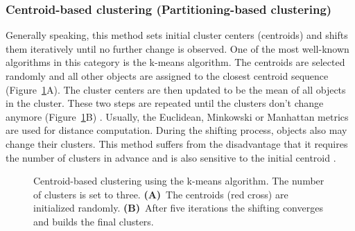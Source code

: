 \documentclass[12pt,a4paper,english]{article}
\begin{document}
\subsubsection*{Centroid-based clustering (Partitioning-based clustering)}
    Generally speaking, this method sets initial cluster centers (centroids) and shifts them iteratively until no further change is observed.
	One of the most well-known algorithms in this category is the k-means algorithm.
	The centroids are selected randomly and all other objects are assigned to the closest centroid sequence (Figure~\ref{img:centroid}A). The cluster centers are then updated to be the mean of all objects in the cluster. These two steps are repeated until the clusters don't change anymore (Figure~\ref{img:centroid}B) \citep{k-means:01}. Usually, the Euclidean, Minkowski or Manhattan metrics are used for distance computation. During the shifting process, objects also may change their clusters.
	This method suffers from the disadvantage that it requires the number of clusters in advance and is also sensitive to the initial centroid \citep{centroid:14}.
	
   	\begin{figure}[H]
		\centering
		\vspace{-10pt}
		\def\svgwidth{\textwidth}
		
		\caption[Centroid-based clustering using the k-means algorithm.]{Centroid-based clustering using the k-means algorithm. The number of clusters is set to three. \textbf{(A)}~The centroids (red cross) are initialized randomly. \textbf{(B)}~After five iterations the shifting converges and builds the final clusters.}
		\label{img:centroid}
	\end{figure}
\end{document}
